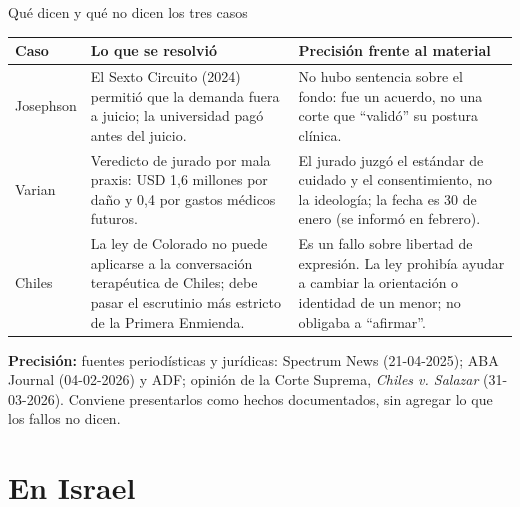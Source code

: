 \documentclass[hyperref={bookmarks=false},aspectratio=169]{beamer}
\newcommand{\precision}[1]{{\footnotesize\color{gris}\textbf{Precisión:} #1}}
\begin{document}
\begin{frame}{Qué dicen y qué no dicen los tres casos}
\scriptsize\renewcommand{\arraystretch}{1.22}
\begin{tabular}{@{}>{\RaggedRight\arraybackslash}p{2.0cm}>{\RaggedRight\arraybackslash}p{4.9cm}>{\RaggedRight\arraybackslash}p{4.9cm}@{}}
\toprule
\textbf{Caso} & \textbf{Lo que se resolvió} & \textbf{Precisión frente al material} \\ \midrule
Josephson & El Sexto Circuito (2024) permitió que la demanda fuera a juicio; la universidad pagó antes del juicio. & No hubo sentencia sobre el fondo: fue un acuerdo, no una corte que ``validó'' su postura clínica. \\
Varian & Veredicto de jurado por mala praxis: USD 1,6 millones por daño y 0,4 por gastos médicos futuros. & El jurado juzgó el estándar de cuidado y el consentimiento, no la ideología; la fecha es 30 de enero (se informó en febrero). \\
Chiles & La ley de Colorado no puede aplicarse a la conversación terapéutica de Chiles; debe pasar el escrutinio más estricto de la Primera Enmienda. & Es un fallo sobre libertad de expresión. La ley prohibía ayudar a cambiar la orientación o identidad de un menor; no obligaba a ``afirmar''. \\
\bottomrule
\end{tabular}\par\medskip
\precision{fuentes periodísticas y jurídicas: Spectrum News (21-04-2025); ABA Journal (04-02-2026) y ADF; opinión de la Corte Suprema, \emph{Chiles v. Salazar} (31-03-2026). Conviene presentarlos como hechos documentados, sin agregar lo que los fallos no dicen.}
\end{frame}

\section{En Israel}
\end{document}
